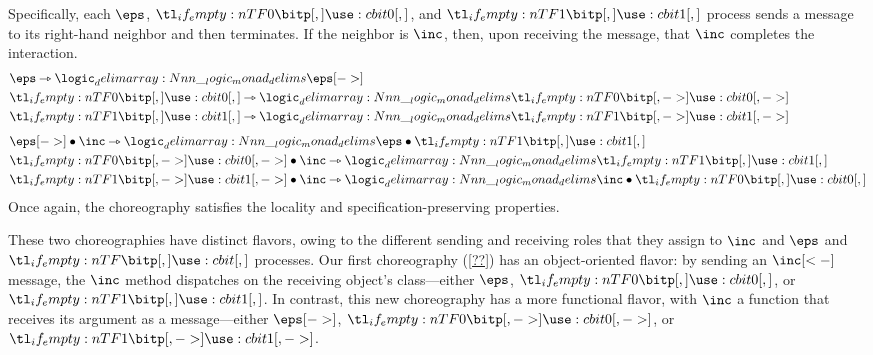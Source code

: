 Specifically, each $\eps$, $\bit{0}$, and $\bit{1}$ process sends a message to its right-hand neighbor and then terminates.
If the neighbor is $\inc$, then, upon receiving the message, that $\inc$ completes the interaction.
\begin{align*}
  &\eps \lrimp \monad{\eps[->]} \\
  &\bit{0} \lrimp \monad{\bit{0}[->]} \\
  &\bit{1} \lrimp \monad{\bit{1}[->]} \\[1.5\jot]
  &\eps[->] \fuse \inc \lrimp \monad{\eps \fuse \bit{1}} \\
  &\bit{0}[->] \fuse \inc \lrimp \monad{\bit{1}} \\
  &\bit{1}[->] \fuse \inc \lrimp \monad{\inc \fuse \bit{0}}
\end{align*}
Once again, the choreography satisfies the locality and specification-preserving properties.

These two choreographies
have distinct flavors, owing to the different sending and receiving roles that they assign to $\inc$ and $\eps$ and $\bit{}$ processes.
Our first choreography (\cref{??}) has an object-oriented flavor: by sending an $\inc[<-]$ message, the $\inc$ method dispatches on the receiving object's class---either $\eps$, $\bit{0}$, or $\bit{1}$.
In contrast, this new choreography has a more functional flavor, with $\inc$ a function that receives its argument as a message---either $\eps[->]$, $\bit{0}[->]$, or $\bit{1}[->]$.



